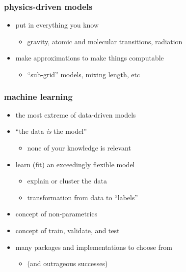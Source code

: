 \documentclass[pdftex]{beamer}
\begin{document}
\begin{frame}
  \frametitle{physics-driven models}
  \begin{itemize}
  \item put in everything you know
    \begin{itemize}
    \item gravity, atomic and molecular transitions, radiation
    \end{itemize}
  \item make approximations to make things computable
    \begin{itemize}
    \item ``sub-grid'' models, mixing length, etc
    \end{itemize}
  \end{itemize}
\end{frame}

\begin{frame}
  \frametitle{machine learning}
  \begin{itemize}
  \item the most extreme of data-driven models
  \item ``the data \emph{is} the model''
    \begin{itemize}
    \item none of your knowledge is relevant
    \end{itemize}
  \item learn (fit) an exceedingly flexible model
    \begin{itemize}
    \item explain or cluster the data
    \item transformation from data to ``labels''
    \end{itemize}
  \item concept of non-parametrics
  \item concept of train, validate, and test
  \item many packages and implementations to choose from
    \begin{itemize}
    \item (and outrageous successes)
    \end{itemize}
  \end{itemize}
\end{frame}
\end{document}
